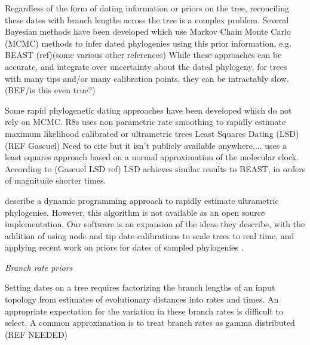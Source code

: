 \documentclass{llncs}
\newcommand{\ejmcomment}[1]{{\color{green} #1}}
\renewcommand{\subsection}[1]{%
\bigskip
\begin{center}
\begin{large}
\normalfont\itshape #1
\end{large}
\end{center}}
\begin{document}
Regardless of the form of dating information or priors on the tree,
reconciling these dates with branch lengths across the tree is a complex problem.
Several Bayesian methods have been developed which use Markov Chain Monte Carlo (MCMC) methods
to infer dated phylogenies using this prior information, e.g. BEAST (ref)(some various other references)
While these approaches can be accurate, and integrate over uncertainty about the dated
phylogeny, for trees with many tips and/or many calibration points, they can be intractably slow. 
(REF/is this even true?)

Some rapid phylogenetic dating approaches have been developed which do not rely on MCMC.
R8s uses non parametric rate smoothing to rapidly estimate maximum likelihood calibrated or ultrametric trees \citep{Sanderson2003}
Least Squares Dating (LSD) (REF Gascuel) 
\ejmcomment{Need to cite but it isn't publicly available anywhere....}
uses a least squares approach based on a normal approximation of the molecular clock.
According to (Gascuel LSD ref) LSD achieves similar results to BEAST, in orders of magnitude shorter times.

\cite{Akerborg2008} describe a dynamic programming approach to 
rapidly estimate ultrametric phylogenies. 
However, this algorithm is not available as an open source implementation.
Our software is an expansion of the ideas they describe, 
with the addition of using node and tip date calibrations to scale trees to real time,
and applying recent work on  priors for dates of sampled phylogenies \citep{Stadler2010}.

\subsection{Branch rate priors}
Setting dates on a tree requires factorizing the branch lengths of an input topology
from estimates of evolutionary distances into rates and times. 
An appropriate expectation for the variation in these branch rates is difficult to select.
A common approximation is to treat branch rates as gamma distributed (REF NEEDED)
\end{document}
